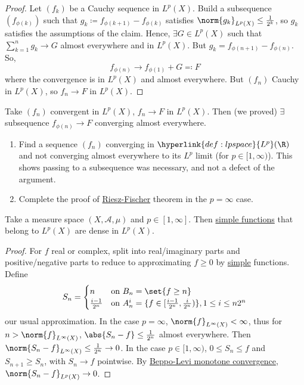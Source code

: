 \documentclass[twoside]{article}
\begin{document}
\begin{proof}
    Let $(f_k)$ be a Cauchy sequence in $L^p(X)$.
    Build a subsequence $(f_{\phi(k)})$ such that $g_k \coloneqq f_{\phi(k+1)} - f_{\phi(k)}$ satisfies $\norm{g_k}_{L^p(X)} \leq \frac{1}{2^k}$, so $g_k$ satisfies the assumptions of the claim.
    Hence, $\exists G \in L^p(X)$ such that $\sum_{k=1}^n g_k \to G$ almost everywhere and in $L^p(X)$. But $g_k = f_{\phi(n+1)} - f_{\phi(n)}$.
    So,
    \begin{equation*}
        f_{\phi(n)} \longrightarrow f_{\phi(1)} + G \eqqcolon F
    \end{equation*}
    where the convergence is in $L^p(X)$ and almost everywhere.
    But $(f_n)$ Cauchy in $L^p(X)$, so $f_n \to F$ in $L^p(X)$.
\end{proof}

\begin{remark}
    Take $(f_n)$ convergent in $L^p(X)$, $f_n \to F$ in $L^p(X)$. Then (we proved) $\exists$ subsequence $f_{\phi(n)} \to F$ converging almost everywhere.
\end{remark}
\begin{ex}
    \leavevmode
    \begin{enumerate}[label=\arabic*)]
        \item Find a sequence $(f_n)$ converging in $\hyperlink{def:lpspace}{L^p}(\R)$ and not converging almost everywhere to its $L^p$ limit (for $p \in [1, \infty)$). This shows passing to a subsequence was necessary, and not a defect of the argument.
        \item Complete the proof of \hyperlink{thm:rieszFischer}{Riesz-Fischer} theorem in the $p=\infty$ case.
    \end{enumerate}
\end{ex}

\begin{thm}
    Take a measure space $(X, \mathscr{A}, \mu)$ and $p \in [1, \infty]$. Then \hyperlink{def:simple}{simple functions} that belong to \hyperlink{def:lpspace}{$L^p(X)$} are dense in $L^p(X)$.
\end{thm}
\begin{proof}
    For $f$ real or complex, split into real/imaginary parts and positive/negative parts to reduce to approximating $f \geq 0$ by \hyperlink{def:simple}{simple} functions.
    Define
    \begin{equation*}
        S_n =
        \begin{cases}
            n & \text{on } B_n = \set{f \geq n} \\
            \frac{i-1}{2^n} & \text{on } A_n^i = \{f \in [\frac{i-1}{2^n}, \frac{i}{2^n})\}, 1 \leq i \leq n 2^n
        \end{cases}
    \end{equation*}
    our usual approximation.
    In the case $p=\infty$, $\norm{f}_{L^\infty(X)} < \infty$, thus for $n > \norm{f}_{L^\infty(X)}$, $\abs{S_n-f} \leq \frac{1}{2^n}$ almost everywhere. Then $\norm{S_n-f}_{L^\infty(X)} \leq \frac{1}{2^n} \to 0$.
    In the case $p \in [1, \infty)$, $0 \leq S_n \leq f$ and $S_{n+1} \geq S_n$, with $S_n \to f$ pointwise. By \hyperlink{thm:Beppo}{Beppo-Levi monotone convergence}, $\norm{S_n - f}_{L^p(X)} \to 0$.
\end{proof}
\end{document}
